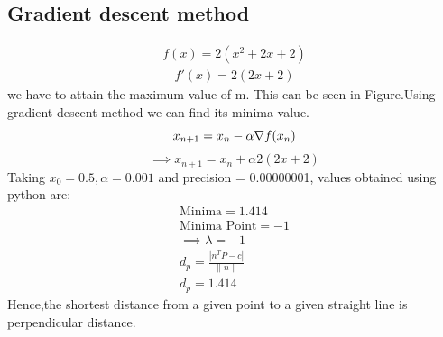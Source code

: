 \documentclass[10pt, a4paper]{article}
\begin{document}
    \subsection*{\normalsize Gradient descent method}
    
    \begin{align}
	\label{eq:vol_varx}
	f(x) = 2(x^2+2x+2)
\end{align}
\begin{align}   
    f'(x) = 2(2x+2)
	\end{align}
we have to attain the maximum value of m. This can be seen in Figure.Using gradient descent method we can find its minima value.
\begin{equation}
        x_{n+1} = x_n - \alpha \nabla f(x_n) \\
\end{equation}
\vspace{1mm}
\begin{equation}
\implies x_{n+1}=x_n+\alpha2(2x+2)
\end{equation}
Taking $x_0=0.5,\alpha=0.001$ and precision = 0.00000001, values obtained using python are:
    \begin{align}
        \text{Minima} = 1.414\\        
        \text{Minima Point} = -1\\
        \implies \lambda=-1\\
         d_p=\frac{|n^TP-c|}{\|n\|}\\
         d_p = 1.414 
    \end{align}
Hence,the shortest distance from a given point to a given straight line is perpendicular distance.    
   
\end{document}
